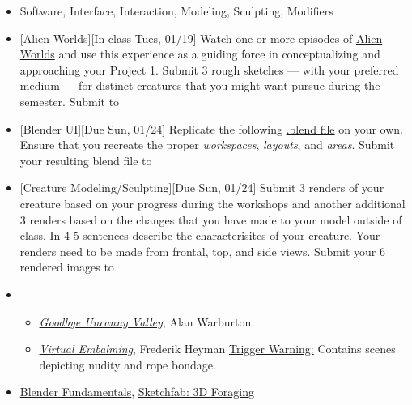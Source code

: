 \def\dMon{Mon, 01/18}
\def\dTues{Tues, 01/19}
\def\dWed{Wed, 01/20}
\def\dThur{Thur, 01/21}
\def\dFri{Fri, 01/22}
\def\dSat{Sat, 01/23}
\def\dSun{Sun, 01/24}
\placeDate

\begin{itemize}[noitemsep,topsep=0pt,leftmargin=*]
      \item {} Software, Interface, Interaction, Modeling, Sculpting, Modifiers
      \item {}[Alien Worlds][In-class \dTues] \newline Watch one or more episodes of \href{https://www.netflix.com/title/80221410}{Alien Worlds} and use this experience as a guiding force in conceptualizing and approaching your Project 1. Submit 3 rough sketches --- with your preferred medium --- for distinct creatures that you might want pursue during the semester. Submit to 
      \item {}[Blender UI][Due \dSun] Replicate the following \href{\#}{.blend file} on your own. Ensure that you recreate the proper \emph{workspaces}, \emph{layouts}, and \emph{areas}. Submit your resulting blend file to \discordE
      \item {}[Creature Modeling/Sculpting][Due \dSun] Submit 3 renders of your creature based on your progress during the workshops and another additional 3 renders based on the changes that you have made to your model outside of class. In 4-5 sentences describe the characterisitcs of your creature. Your renders need to be made from frontal, top, and side views. Submit your 6 rendered images to \discordE
      \item {}
            \begin{itemize}
                  \item \href{https://alanwarburton.co.uk/goodbye-uncanny-valley}{\emph{Goodbye Uncanny Valley}}, Alan Warburton.
                  \item \href{https://www.nowness.com/story/virtual-embalming-frederik-heyman}{\emph{Virtual Embalming}}, Frederik Heyman \newline
                        \small{\ul{Trigger Warning:} Contains scenes depicting nudity and rope bondage.}
            \end{itemize}
      \item {} \href{https://cloud.blender.org/p/blender-fundamentals/}{Blender Fundamentals}, \href{https://sketchfab.com/search?features\=downloadable\&q\=scan+heritage\&sort\_by\=-relevance\&type\=models}{Sketchfab: 3D Foraging}
\end{itemize}